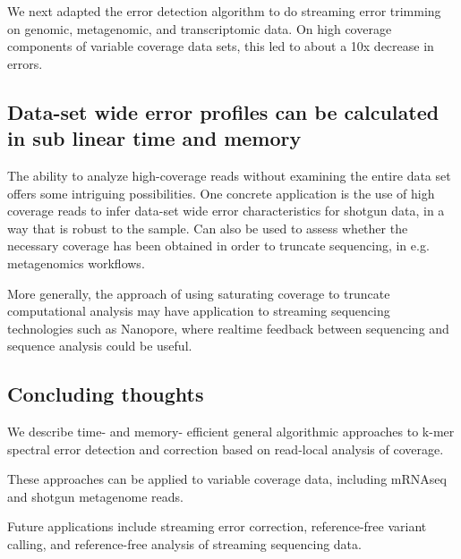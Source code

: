 \documentclass{article}
\begin{document}
We next adapted the error detection algorithm to do streaming error
trimming on genomic, metagenomic, and transcriptomic data.  On high
coverage components of variable coverage data sets, this led to about
a 10x decrease in errors.

\subsection{Data-set wide error profiles can be calculated in sub linear time and memory}

The ability to analyze high-coverage reads without examining the
entire data set offers some intriguing possibilities.  One concrete
application is the use of high coverage reads to infer data-set wide
error characteristics for shotgun data, in a way that is robust to the
sample.  Can also be used to assess whether the necessary coverage has
been obtained in order to truncate sequencing, in e.g. metagenomics
workflows.

More generally, the approach of using saturating coverage to truncate
computational analysis may have application to streaming sequencing
technologies such as Nanopore, where realtime feedback between
sequencing and sequence analysis could be useful.

\subsection{Concluding thoughts}

We describe time- and memory- efficient general algorithmic approaches
to k-mer spectral error detection and correction based on read-local
analysis of coverage.

These approaches can be applied to variable coverage data, including
mRNAseq and shotgun metagenome reads.

Future applications include streaming error correction, reference-free
variant calling, and reference-free analysis of streaming sequencing
data.
\end{document}
